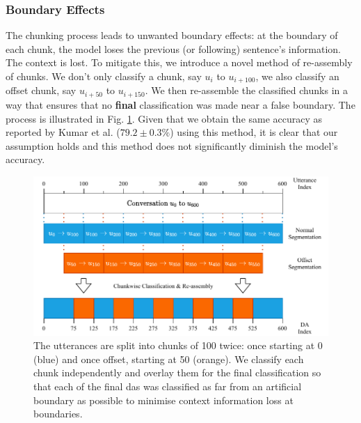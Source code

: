         \subsubsection{Boundary Effects}
            The chunking process leads to unwanted boundary effects: at the boundary of each chunk, the \gls{model} loses the previous (or following) sentence's information. The context is lost. To mitigate this, we introduce a novel method of re-assembly of chunks. We don't only classify a chunk, say $u_{i}$ to $u_{i + 100}$, we also classify an offset chunk, say $u_{i + 50}$ to $u_{i + 150}$. We then re-assemble the classified chunks in a way that ensures that no \textbf{final} classification was made near a false boundary. The process is illustrated in Fig. \ref{fig:chunking process}. Given that we obtain the same accuracy as reported by Kumar et al. ($79.2 \pm 0.3\%$)\cite{kumar2017dialogue} using this method, it is clear that our assumption holds and this method does not significantly diminish the \gls{model}'s accuracy.

    \begin{figure}[h]
        \centering
        \includegraphics[width=\textwidth]{figures/chunks.pdf}
        \caption{The \glspl{utterance} are split into chunks of 100 twice: once starting at 0 (blue) and once offset, starting at 50 (orange). We classify each chunk independently and overlay them for the final classification so that each of the final \glspl{da} was classified as far from an artificial boundary as possible to minimise context information loss at boundaries.}
        \label{fig:chunking process}
    \end{figure}

